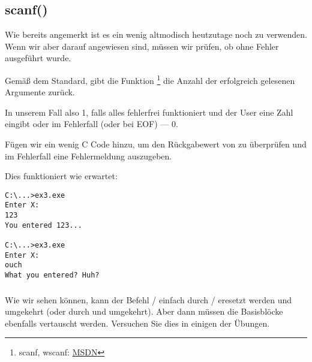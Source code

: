 \subsection{scanf()}
Wie bereits angemerkt ist es ein wenig altmodisch heutzutage noch \scanf zu verwenden. 
Wenn wir aber darauf angewiesen sind, müssen wir prüfen, ob \scanf ohne Fehler ausgeführt wurde.


Gemäß dem Standard, gibt die Funktion \scanf\footnote{scanf, wscanf: \href{http://msdn.microsoft.com/en-us/library/9y6s16x1(VS.71).aspx}{MSDN}} die
Anzahl der erfolgreich gelesenen Argumente zurück.

In unserem Fall also 1, falls alles fehlerfrei funktioniert und der User eine Zahl eingibt oder im Fehlerfall (oder bei
\ac{EOF}) --- 0.

Fügen wir ein wenig C Code hinzu, um den Rückgabewert von \scanf zu überprüfen und im Fehlerfall eine Fehlermeldung
auszugeben.

Dies funktioniert wie erwartet:

\begin{lstlisting}
C:\...>ex3.exe
Enter X:
123
You entered 123...

C:\...>ex3.exe
Enter X:
ouch
What you entered? Huh?
\end{lstlisting}






\subsubsection{\Exercise}

Wie wir sehen können, kann der Befehl / einfach durch / eresetzt werden und umgekehrt
(oder  durch  und umgekehrt).
Aber dann müssen die Basisblöcke ebenfalls vertauscht werden. 
Versuchen Sie dies in einigen der Übungen.
